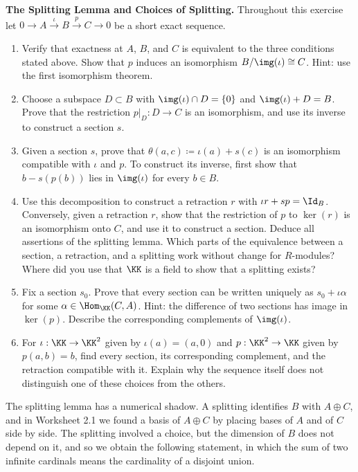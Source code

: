 \documentclass[12pt,reqno]{amsart}
\begin{document}
\begin{problems}
\item\label{t:split} \textbf{The Splitting Lemma and Choices of Splitting.} Throughout this exercise let $0\to A\xrightarrow{\iota}B\xrightarrow{p}C\to0$ be a short exact sequence.
\begin{enumerate}
\item Verify that exactness at $A$, $B$, and $C$ is equivalent to the three conditions stated above. Show that $p$ induces an isomorphism $B/\img(\iota)\cong C$. Hint: use the first isomorphism theorem.
\item Choose a subspace $D\subset B$ with $\img(\iota)\cap D=\{0\}$ and $\img(\iota)+D=B$. Prove that the restriction $p|_D:D\to C$ is an isomorphism, and use its inverse to construct a section $s$.
\item Given a section $s$, prove that $\theta(a,c)\coloneqq\iota(a)+s(c)$ is an isomorphism compatible with $\iota$ and $p$. To construct its inverse, first show that $b-s(p(b))$ lies in $\img(\iota)$ for every $b\in B$.
\item Use this decomposition to construct a retraction $r$ with $\iota r+sp=\Id_B$. Conversely, given a retraction $r$, show that the restriction of $p$ to $\ker(r)$ is an isomorphism onto $C$, and use it to construct a section. Deduce all assertions of the splitting lemma. Which parts of the equivalence between a section, a retraction, and a splitting work without change for $R$-modules? Where did you use that $\KK$ is a field to show that a splitting exists?
\item Fix a section $s_0$. Prove that every section can be written uniquely as $s_0+\iota\alpha$ for some $\alpha\in\Hom_{\KK}(C,A)$. Hint: the difference of two sections has image in $\ker(p)$. Describe the corresponding complements of $\img(\iota)$.
\item For $\iota:\KK\to\KK^2$ given by $\iota(a)=(a,0)$ and $p:\KK^2\to\KK$ given by $p(a,b)=b$, find every section, its corresponding complement, and the retraction compatible with it. Explain why the sequence itself does not distinguish one of these choices from the others.
\end{enumerate}
\end{problems}

\hrulefill

The splitting lemma has a numerical shadow. A splitting identifies $B$ with $A\oplus C$, and in Worksheet 2.1 we found a basis of $A\oplus C$ by placing bases of $A$ and of $C$ side by side. The splitting involved a choice, but the dimension of $B$ does not depend on it, and so we obtain the following statement, in which the sum of two infinite cardinals means the cardinality of a disjoint union.
\end{document}
